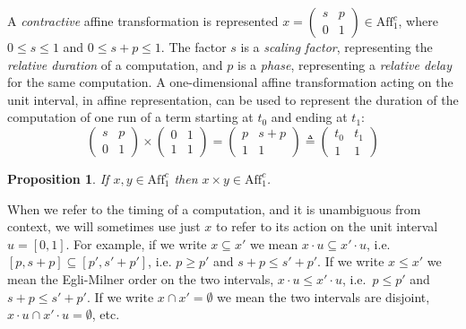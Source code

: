 \documentclass{article}
\newcommand{\defeq}{\triangleq}
\newcommand{\aff}{\mathrm{Aff}_1^c}
\newtheorem{proposition}[theorem]{Proposition}
\begin{document}
A \emph{contractive} affine transformation is represented
$
x = 
\left(
\begin{matrix}
s & p \\
0 & 1
\end{matrix}
\right)
\in\aff$, where  $0\leq s\leq 1$ and $0\leq s+ p\leq 1.
$
The factor $s$ is a \emph{scaling factor}, representing the \emph{relative duration}
of a computation, and $p$ is a \emph{phase}, representing a \emph{relative delay} for the same  computation. A one-dimensional affine transformation acting on the unit interval, in affine representation, can be used to represent the duration of the computation of one run of a term starting at $t_0$ and ending at $t_1$:
\[
\left(
\begin{matrix}
s & p \\
0 & 1
\end{matrix}
\right)
\times
\left(
\begin{matrix}
0 & 1 \\
1 & 1
\end{matrix}
\right)
=\left(
\begin{matrix}
p & s+p \\
1 & 1
\end{matrix}
\right)\defeq
\left(
\begin{matrix}
t_0 & t_1 \\
1 & 1
\end{matrix}
\right)
\]

\begin{proposition}
If $x,y\in\aff$ then $x\times y\in\aff$. 
\end{proposition}

When we refer to the timing of a computation, and it is unambiguous from context, we will sometimes use just $x$ to refer to its action on the unit interval $u=[0,1]$. For example, if we write $x\subseteq x'$ we mean $x\cdot u\subseteq x'\cdot u$, i.e.\   $[p,s+p]\subseteq[p',s'+p']$, i.e. $p\geq p'$ and $s+p\leq s'+p'$.  If we write $x\leq x'$ we mean the Egli-Milner order on the two intervals, $x\cdot u\leq x'\cdot u$, i.e.\   $p\leq p'$ and $s+p\leq s'+p'$.  If we write $x\cap x'=\emptyset$ we mean the two intervals are disjoint, $x\cdot u\cap x'\cdot u=\emptyset$, etc.
\end{document}
